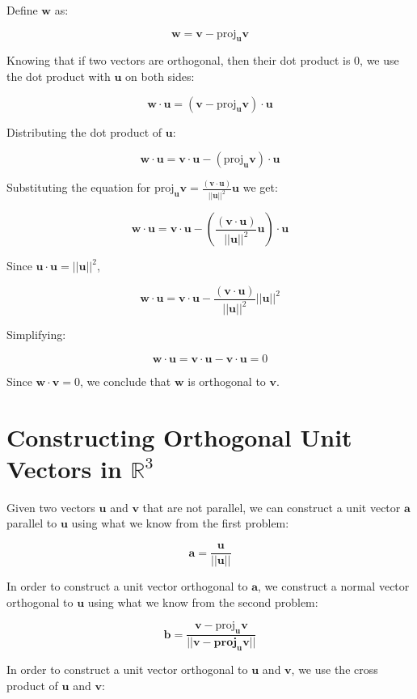\documentclass{article}
\newcommand{\R}{\ensuremath{\mathbb{R}}}
\newcommand{\mbf}[1]{\mathbf{#1}}
\newcommand{\magn}[1]{||\mbf{#1}||}
\begin{document}
Define \(\mbf{w}\) as:

\[
 \mbf{w} = \mbf{v} - \text{proj}_{\mbf{u}} \mbf{v}
\]

Knowing that if two vectors are orthogonal, then their dot product is 0, we use the dot product with \(\mbf{u}\) on both sides:

\[
 \mbf{w} \cdot \mbf{u} = (\mbf{v} - \text{proj}_{\mbf{u}} \mbf{v}) \cdot \mbf{u}
\]

Distributing the dot product of \(\mbf{u}\):

\[
 \mbf{w} \cdot \mbf{u} = \mbf{v} \cdot \mbf{u} - (\text{proj}_{\mbf{u}} \mbf{v}) \cdot \mbf{u}
\]

Substituting the equation for \(\text{proj}_{\mbf{u}} \mbf{v} = \frac{(\mbf{v} \cdot \mbf{u})}{||\mbf{u}||^2} \mbf{u}\) we get:

\[
 \mbf{w} \cdot \mbf{u} = \mbf{v} \cdot \mbf{u} - \left( \frac{(\mbf{v} \cdot \mbf{u})}{||\mbf{u}||^2} \mbf{u} \right) \cdot \mbf{u}
\]

Since \(\mbf{u} \cdot \mbf{u} = ||\mbf{u}||^2\),

\[
 \mbf{w} \cdot \mbf{u} = \mbf{v} \cdot \mbf{u} - \frac{(\mbf{v} \cdot \mbf{u})}{||\mbf{u}||^2} ||\mbf{u}||^2
\]

Simplifying:

\[
 \mbf{w} \cdot \mbf{u} = \mbf{v} \cdot \mbf{u} - \mbf{v} \cdot \mbf{u} = 0
\]

Since \(\mbf{w} \cdot \mbf{v} = 0\), we conclude that \(\mbf{w}\) is orthogonal to \(\mbf{v}\).

\section{Constructing Orthogonal Unit Vectors in $\R^3$}

Given two vectors \(\mbf{u}\) and \(\mbf{v}\) that are not parallel, we can construct a unit vector \(\mbf{a}\) parallel to \(\mbf{u}\) using what we know from the first problem:

\[
 \mbf{a} = \frac{\mbf{u}}{\magn{u}}
\]

In order to construct a unit vector orthogonal to \(\mbf{a}\), we construct a normal vector orthogonal to \(\mbf{u}\) using what we know from the second problem:

\[
 \mbf{b} = \frac{\mbf{v} - \text{proj}_{\mbf{u}} \mbf{v}}{\magn{\mbf{v} - \text{proj}_{\mbf{u}} \mbf{v}}}
\]

In order to construct a unit vector orthogonal to \(\mbf{u}\) and \(\mbf{v}\), we use the cross product of \(\mbf{u}\) and \(\mbf{v}\):
\end{document}
